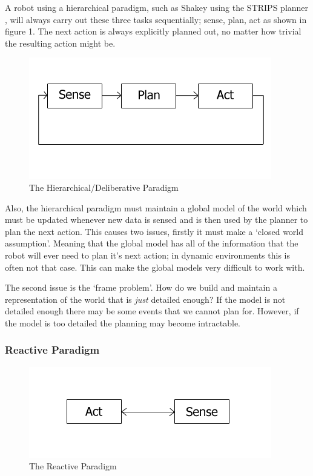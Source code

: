 A robot using a hierarchical paradigm, such as Shakey using the STRIPS planner \parencite{Fikes:1971:SNA:1622876.1622939}, will always carry out these three tasks sequentially; sense, plan, act \parencite{Murphy:2000:IAR:517685} as shown in figure 1. The next action is always explicitly planned out, no matter how trivial the resulting action might be. 

\begin{figure}[h]
\centering
\includegraphics[scale=0.4]{Hierarchical}
\caption{The Hierarchical/Deliberative Paradigm}
\end{figure}

Also, the hierarchical paradigm must maintain a global model of the world which must be updated whenever new data is sensed and is then used by the planner to plan the next action. This causes two issues, firstly it must make a ‘closed world assumption’. Meaning that the global model has all of the information that the robot will ever need to plan it’s next action; in dynamic environments this is often not that case. This can make the global models very difficult to work with.

The second issue is the ‘frame problem’. How do we build and maintain a representation of the world that is \textit{just} detailed enough? If the model is not detailed enough there may be some events that we cannot plan for. However, if the model is too detailed the planning may become intractable.

\subsubsection{Reactive Paradigm}

\begin{figure}[h]
\centering
\includegraphics[scale=0.4]{Reactive}
\caption{The Reactive Paradigm}
\end{figure}

